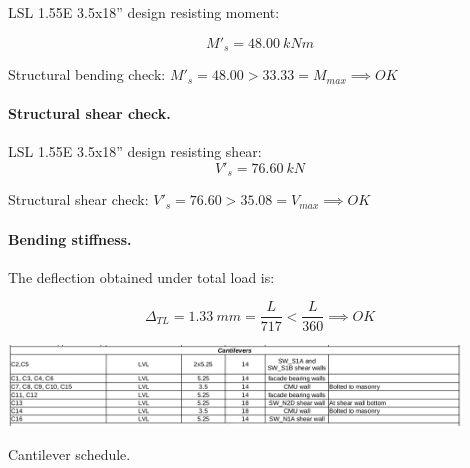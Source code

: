 \noindent LSL 1.55E 3.5x18'' design resisting moment:

\begin{equation}
  M'_s= 48.00\ kN m
\end{equation}

\noindent Structural bending check: $M'_s = 48.00 > 33.33 = M_{max} \implies OK$

\paragraph{Structural shear check.}

\noindent LSL 1.55E 3.5x18'' design resisting shear:
\begin{equation}
  V'_s= 76.60\ kN
\end{equation}

\noindent Structural shear check: $V'_s = 76.60 > 35.08 = V_{max} \implies OK$

\paragraph{Bending stiffness.}
The deflection obtained under total load is:

\begin{equation}
  \Delta_{TL}= 1.33\ mm= \frac{L}{717} < \frac{L}{360} \implies OK
\end{equation}

\begin{table}
  \begin{center}
  \includegraphics[width=120mm]{figures/cantilevers/cantilever_schedule}
  \end{center}
  \caption{Cantilever schedule.}\label{fg_2nd_floor_cantilevers_schedule}
\end{table}
